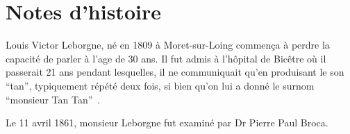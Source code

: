 \section{Notes d'histoire}

Louis Victor Leborgne, né en 1809 à Moret-sur-Loing commença à perdre la capacité de parler à l'age de 30 ans.
Il fut admis à l'hôpital de Bicêtre où il passerait 21 ans pendant lesquelles, 
il ne communiquait qu'en produisant le son ``tan'', typiquement répété deux fois, 
si bien qu'on lui a donné le surnom ``monsieur Tan Tan''~\cite{Mohammed_Narayan_Patra_Nanda_2018}.

Le 11 avril 1861, monsieur Leborgne fut examiné par Dr Pierre Paul Broca.

